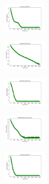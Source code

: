 \vspace*{\fill}
\newpage
\vspace*{\fill}

\begin{figure}[H]
    \centering
    \begin{subfigure}
        \centering
        \includegraphics[width=0.234\textwidth]{img/aggsf/iris_set_const_10_949004259_cost.png}
    \end{subfigure}
    \hfill
    \begin{subfigure}
        \centering
        \includegraphics[width=0.234\textwidth]{img/aggsf/ecoli_set_const_10_949004259_cost.png}
    \end{subfigure}
    \hfill
    \begin{subfigure}
        \centering
        \includegraphics[width=0.234\textwidth]{img/aggsf/rand_set_const_10_949004259_cost.png}
    \end{subfigure}
    \hfill
    \begin{subfigure}
        \centering
        \includegraphics[width=0.234\textwidth]{img/aggsf/newthyroid_set_const_10_949004259_cost.png}
    \end{subfigure}
    \hfill
    \begin{subfigure}
        \centering
        \includegraphics[width=0.234\textwidth]{img/aggsf/iris_set_const_10_589741062_cost.png}

\end{subfigure}
\end{figure}
